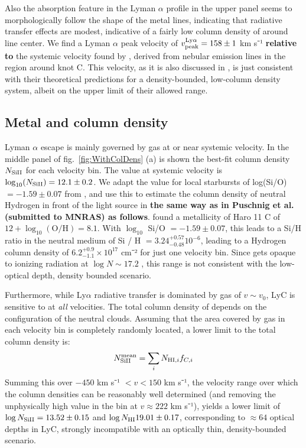 \documentclass[twocolumn, trackchanges]{aastex61}
\begin{document}
Also the absorption feature in the Lyman $\alpha$ profile in the upper
panel seems to morphologically follow the shape of the metal lines,
indicating that radiative transfer effects are modest, indicative of a
fairly low column density of  around line center. We find a
Lyman $\alpha$ peak velocity of
$v_{\rm peak}^{\mathrm{Ly}\alpha} = 158 \pm 1$ km s⁻¹ \textbf{relative to} the 
systemic velocity found by \citet{Sandberg2013}, derived from nebular emission
lines in the region around knot C. This velocity, as it is also
discussed in \citet{Verhamme2015}, is just consistent with their
theoretical predictions for a density-bounded, low-column density
system, albeit on the upper limit of their allowed range.

\subsection{Metal and  column
density}\label{metal-and-column-density}

Lyman $\alpha$ escape is mainly governed by gas at or near systemic
velocity. In the middle panel of fig.~\ref{fig:WithColDens} (a) is shown
the best-fit column density $N_{\rm Si II}$ for each velocity bin. The
value at systemic velocity is $\log_{10}(N_{\rm Si II}) = 12.1 \pm 0.2$.
We adapt the value for local starbursts of log(Si/O) $= -1.59 \pm 0.07$
from \citet{Garnett1995}, and use this to estimate the column density of
neutral Hydrogen in front of the light source in \textbf{the same way as in
Puschnig et al. (submitted to MNRAS) as follows}. \citet{Guseva2012}
found a metallicity of Haro 11 C of $12 + \log_{10}(\text{O/H}) = 8.1$.
With $\log_{10}$ Si/O $= -1.59 \pm 0.07$, this leads to a Si/H ratio in
the neutral medium of Si / H $= 3.24^{+0.57}_{-0.48} 10^{-6}$, leading
to a Hydrogen column density of $6.2^{+0.9}_{-1.1} \times 10^{17}$ cm⁻²
for just one velocity bin. Since  gets opaque to ionizing radiation at
$\log N \sim 17.2$ \citep{Verhamme2015}, this range is not consistent
with the low- optical depth, density bounded scenario.

Furthermore, while Ly$\alpha$ radiative transfer is dominated by gas of
$v \sim v_0$, LyC is sensitive to  at \emph{all}
velocities. The total column density of  depends on the
configuration of the neutral clouds. Assuming that the area covered by
gas in each velocity bin is completely randomly located, a lower limit
to the total column density is:
%
\begin{equation}
\label{NHImean}
N_{\rm Si II}^{\rm mean} = \sum_i N_{\text{HI}, i} f_{C, i}
\end{equation}
%
Summing this over $-450$ km s⁻¹ $< v < 150$ km s⁻¹, the velocity range
over which the column densities can be reasonably well determined (and
removing the unphysically high value in the bin at $v \approx 222$ km
s⁻¹), yields a lower limit of $\log N_{\rm Si II} = 13.52 \pm 0.15$ and
$\log N_{\rm H I} 19.01 \pm 0.17$, corresponding to $\approx 64$ optical
depths in LyC, strongly incompatible with an optically thin,
density-bounded scenario.
\end{document}
